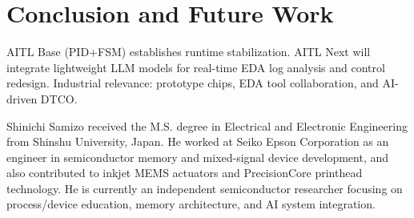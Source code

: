 \documentclass[conference]{IEEEtran}
\begin{document}
\section{Conclusion and Future Work}
AITL Base (PID+FSM) establishes runtime stabilization.  
AITL Next will integrate lightweight LLM models for real-time EDA log analysis and control redesign.  
Industrial relevance: prototype chips, EDA tool collaboration, and AI-driven DTCO.




\begin{IEEEbiographynophoto}{Shinichi Samizo}
received the M.S. degree in Electrical and Electronic Engineering from Shinshu University, Japan.
He worked at Seiko Epson Corporation as an engineer in semiconductor memory and mixed-signal device development,
and also contributed to inkjet MEMS actuators and PrecisionCore printhead technology.
He is currently an independent semiconductor researcher focusing on process/device education,
memory architecture, and AI system integration.
\end{IEEEbiographynophoto}
\end{document}
